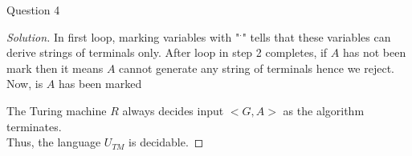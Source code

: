 \begin{solution}{Question 4}
\begin{proof}[Solution]
        In first loop, marking variables with "$^\cdot$" tells that these variables can derive strings of terminals only. After loop in step 2 completes, if $A$ has not been mark then it means $A$  cannot generate any string of terminals hence we reject. Now, is $A$ has been marked
        
        
        The Turing machine $R$ always decides input $<G, A>$ as the algorithm terminates.
        \\
        Thus, the language $U_{TM}$ is decidable.
    \end{proof}
\end{solution}
